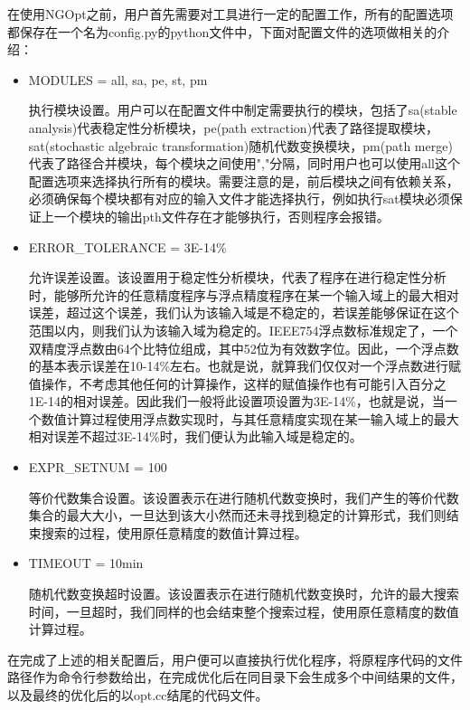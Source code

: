 在使用NGOpt之前，用户首先需要对工具进行一定的配置工作，所有的配置选项都保存在一个名为config.py的python文件中，下面对配置文件的选项做相关的介绍：

\begin{itemize}

    \item MODULES = all, sa, pe, st, pm 

    执行模块设置。用户可以在配置文件中制定需要执行的模块，包括了sa(stable analysis)代表稳定性分析模块，pe(path extraction)代表了路径提取模块，sat(stochastic algebraic transformation)随机代数变换模块，pm(path merge)代表了路径合并模块，每个模块之间使用","分隔，同时用户也可以使用all这个配置选项来选择执行所有的模块。需要注意的是，前后模块之间有依赖关系，必须确保每个模块都有对应的输入文件才能选择执行，例如执行sat模块必须保证上一个模块的输出pth文件存在才能够执行，否则程序会报错。

    \item ERROR\_TOLERANCE = 3E-14\%

    允许误差设置。该设置用于稳定性分析模块，代表了程序在进行稳定性分析时，能够所允许的任意精度程序与浮点精度程序在某一个输入域上的最大相对误差，超过这个误差，我们认为该输入域是不稳定的，若误差能够保证在这个范围以内，则我们认为该输入域为稳定的。IEEE754浮点数标准规定了，一个双精度浮点数由64个比特位组成，其中52位为有效数字位。因此，一个浮点数的基本表示误差在10-14\%左右。也就是说，就算我们仅仅对一个浮点数进行赋值操作，不考虑其他任何的计算操作，这样的赋值操作也有可能引入百分之1E-14的相对误差。因此我们一般将此设置项设置为3E-14\%，也就是说，当一个数值计算过程使用浮点数实现时，与其任意精度实现在某一输入域上的最大相对误差不超过3E-14\%时，我们便认为此输入域是稳定的。

    \item EXPR\_SETNUM = 100

    等价代数集合设置。该设置表示在进行随机代数变换时，我们产生的等价代数集合的最大大小，一旦达到该大小然而还未寻找到稳定的计算形式，我们则结束搜索的过程，使用原任意精度的数值计算过程。

    \item TIMEOUT = 10min

    随机代数变换超时设置。该设置表示在进行随机代数变换时，允许的最大搜索时间，一旦超时，我们同样的也会结束整个搜索过程，使用原任意精度的数值计算过程。

\end{itemize}

在完成了上述的相关配置后，用户便可以直接执行优化程序，将原程序代码的文件路径作为命令行参数给出，在完成优化后在同目录下会生成多个中间结果的文件，以及最终的优化后的以opt.cc结尾的代码文件。


